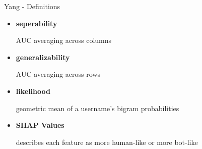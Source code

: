 \documentclass[aspectratio=169, 10pt]{beamer}
\begin{document}
\begin{frame}{Yang - Definitions}
  \begin{itemize}
    \item \textbf{seperability}
      \begin{indentedblock}
        \small AUC averaging across columns
      \end{indentedblock}
    \item \textbf{generalizability}
      \begin{indentedblock}
        \small AUC averaging across rows
      \end{indentedblock}
    \item \textbf{likelihood}
      \begin{indentedblock}
        \small geometric mean of a username's bigram probabilities
      \end{indentedblock}
    \item \textbf{SHAP Values}
      \begin{indentedblock}
        \small describes each feature as more human-like or more bot-like
      \end{indentedblock}
  \end{itemize}
\end{frame}
\end{document}
